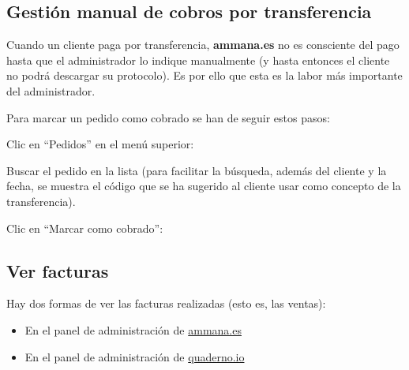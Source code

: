 \documentclass[12pt, spanish]{article}
\newcommand{\screenshot}[2][1]{

        \medskip
        \begin{minipage}[t]{\linewidth}
            \raggedright
            \adjustbox{valign=t}{%
                \fbox{\texttt{[image: \#2]}}
            }
        \end{minipage}
}
\begin{document}

    \subsection{Gestión manual de cobros por transferencia}

    \label{sec:mark-orders-as-paid}

            Cuando un cliente paga por transferencia, \textbf{ammana.es} no es consciente del
        pago hasta que el administrador lo indique manualmente (y hasta entonces el cliente no
        podrá descargar su protocolo). Es por ello que esta es la labor más importante del
        administrador.

            Para marcar un pedido como cobrado se han de seguir estos pasos:

    \begin{steps}

        \item Clic en ``Pedidos'' en el menú superior:
            \screenshot{mark-paid/1.png}

        \item Buscar el pedido en la lista (para facilitar la búsqueda, además del cliente y
            la fecha, se muestra el código que se ha sugerido al cliente usar como concepto
            de la transferencia).

        \item Clic en ``Marcar como cobrado'':
            \screenshot{mark-paid/2.png}

    \end{steps}


    \subsection{Ver facturas}

    \label{sec:invoices}

        Hay dos formas de ver las facturas realizadas (esto es, las ventas):

        \begin{itemize}
            \item En el panel de administración de \url{ammana.es}
            \item En el panel de administración de \url{quaderno.io}
        \end{itemize}
\end{document}
